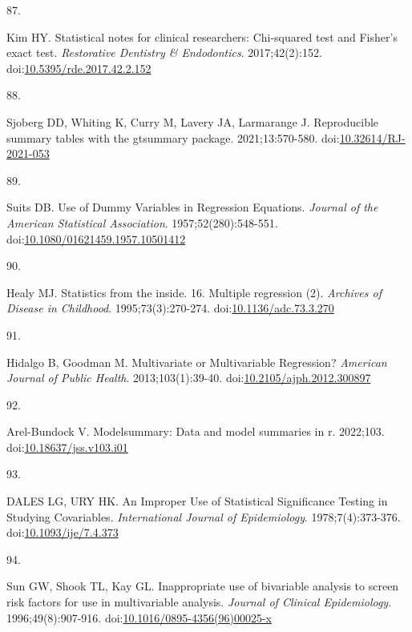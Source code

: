 \documentclass[
]{book}
\newlength{\cslhangindent}
\newlength{\csllabelwidth}
\newlength{\cslentryspacingunit} %
\newenvironment{CSLReferences}[2] %
 {%
  \setlength{\parindent}{0pt}
  \ifodd #1
  \let\oldpar\par
  \def\par{\hangindent=\cslhangindent\oldpar}
  \fi
  \setlength{\parskip}{#2\cslentryspacingunit}
 }%
 {}
\newcommand{\CSLLeftMargin}[1]{\parbox[t]{\csllabelwidth}{#1}}
\newcommand{\CSLRightInline}[1]{\parbox[t]{\linewidth - \csllabelwidth}{#1}\break}
\begin{document}
\begin{CSLReferences}{0}{0}
\leavevmode{}%
\CSLLeftMargin{87. }%
\CSLRightInline{Kim HY. Statistical notes for clinical researchers: Chi-squared test and Fisher's exact test. \emph{Restorative Dentistry \& Endodontics}. 2017;42(2):152. doi:\href{https://doi.org/10.5395/rde.2017.42.2.152}{10.5395/rde.2017.42.2.152}}

\leavevmode{}%
\CSLLeftMargin{88. }%
\CSLRightInline{Sjoberg DD, Whiting K, Curry M, Lavery JA, Larmarange J. Reproducible summary tables with the gtsummary package. 2021;13:570-580. doi:\href{https://doi.org/10.32614/RJ-2021-053}{10.32614/RJ-2021-053}}

\leavevmode{}%
\CSLLeftMargin{89. }%
\CSLRightInline{Suits DB. Use of Dummy Variables in Regression Equations. \emph{Journal of the American Statistical Association}. 1957;52(280):548-551. doi:\href{https://doi.org/10.1080/01621459.1957.10501412}{10.1080/01621459.1957.10501412}}

\leavevmode{}%
\CSLLeftMargin{90. }%
\CSLRightInline{Healy MJ. Statistics from the inside. 16. Multiple regression (2). \emph{Archives of Disease in Childhood}. 1995;73(3):270-274. doi:\href{https://doi.org/10.1136/adc.73.3.270}{10.1136/adc.73.3.270}}

\leavevmode{}%
\CSLLeftMargin{91. }%
\CSLRightInline{Hidalgo B, Goodman M. Multivariate or Multivariable Regression? \emph{American Journal of Public Health}. 2013;103(1):39-40. doi:\href{https://doi.org/10.2105/ajph.2012.300897}{10.2105/ajph.2012.300897}}

\leavevmode{}%
\CSLLeftMargin{92. }%
\CSLRightInline{Arel-Bundock V. {\textbraceleft}Modelsummary{\textbraceright}: Data and model summaries in {\textbraceleft}r{\textbraceright}. 2022;103. doi:\href{https://doi.org/10.18637/jss.v103.i01}{10.18637/jss.v103.i01}}

\leavevmode{}%
\CSLLeftMargin{93. }%
\CSLRightInline{DALES LG, URY HK. An Improper Use of Statistical Significance Testing in Studying Covariables. \emph{International Journal of Epidemiology}. 1978;7(4):373-376. doi:\href{https://doi.org/10.1093/ije/7.4.373}{10.1093/ije/7.4.373}}

\leavevmode{}%
\CSLLeftMargin{94. }%
\CSLRightInline{Sun GW, Shook TL, Kay GL. Inappropriate use of bivariable analysis to screen risk factors for use in multivariable analysis. \emph{Journal of Clinical Epidemiology}. 1996;49(8):907-916. doi:\href{https://doi.org/10.1016/0895-4356(96)00025-x}{10.1016/0895-4356(96)00025-x}}


\end{CSLReferences}
\end{document}
